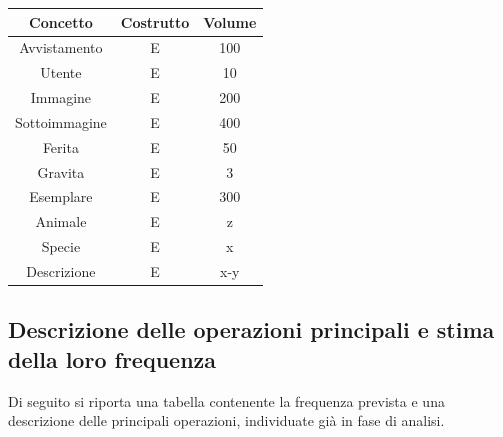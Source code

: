 \documentclass[a4paper,final,12pt]{report}
\begin{document}
\begin{table}[hbtp]
\centering
\begin{tabular}{|c|c|c|}
\hline
\rowcolor[HTML]{C0C0C0} 
{\color[HTML]{000000} Concetto} & {\color[HTML]{000000} Costrutto} & {\color[HTML]{000000} Volume} \\ \hline
Avvistamento           & E & 100 \\ \hline
Utente                 & E & 10  \\ \hline
Immagine               & E & 200 \\ \hline
Sottoimmagine          & E & 400 \\ \hline
Ferita                 & E & 50  \\ \hline
Gravita                & E & 3   \\ \hline
Esemplare              & E & 300 \\ \hline
Animale                & E & z   \\ \hline
Specie                 & E & x   \\ \hline
Descrizione            & E & x-y \\ \hline
\end{tabular}
\end{table}

\subsection{Descrizione delle operazioni principali e stima della loro frequenza}
Di seguito si riporta una tabella contenente la frequenza prevista e una descrizione delle principali operazioni, individuate già in fase di analisi.
\begin{table}[hbtp]
\centering
{}
\end{table}
\end{document}
